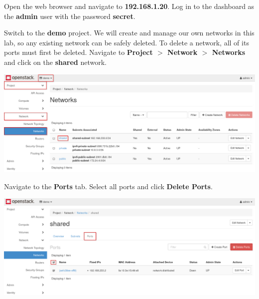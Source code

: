\documentclass[letterpaper, 12pt]{article}
\begin{document}
\begin{enumerate}
    \begin{labstep}
        Open the web browser and navigate to \textbf{192.168.1.20}.
        Log in to the dashboard as the \textbf{admin} user with the password \textbf{secret}.
    \end{labstep}

    \begin{labstep}
        Switch to the \textbf{demo} project.
        We will create and manage our own networks in this lab, so any existing network can be safely deleted.
        To delete a network, all of its ports must first be deleted.
        Navigate to \textbf{Project $>$ Network $>$ Networks} and click on the \textbf{shared} network.

        \begin{center}
            \includegraphics[width=\linewidth]{images/part3/step2.png}
        \end{center}
    \end{labstep}

    \begin{labstep}
        Navigate to the \textbf{Ports} tab.
        Select all ports and click \textbf{Delete Ports}.

        \begin{center}
            \includegraphics[width=\linewidth]{images/part3/step3.png}
        \end{center}
    \end{labstep}


\end{enumerate}
\end{document}
